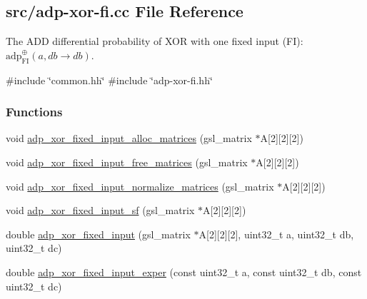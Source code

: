 \hypertarget{adp-xor-fi_8cc}{\subsection{src/adp-\/xor-\/fi.cc \-File \-Reference}
\label{adp-xor-fi_8cc}
}


\-The \-A\-D\-D differential probability of \-X\-O\-R with one fixed input (\-F\-I)\-: $\mathrm{adp}^{\oplus}_{\mathrm{FI}}(a,db \rightarrow db)$.  


{\ttfamily \#include \char`\"{}common.\-hh\char`\"{}}\*
{\ttfamily \#include \char`\"{}adp-\/xor-\/fi.\-hh\char`\"{}}\*
\subsubsection*{\-Functions}
\begin{DoxyCompactItemize}
\item 
void \hyperlink{adp-xor-fi_8cc_a605b1bc0ca9dd17b1dfc2b818bb1fcc4}{adp\-\_\-xor\-\_\-fixed\-\_\-input\-\_\-alloc\-\_\-matrices} (gsl\-\_\-matrix $\ast$\-A\mbox{[}2\mbox{]}\mbox{[}2\mbox{]}\mbox{[}2\mbox{]})
\item 
void \hyperlink{adp-xor-fi_8cc_acb74304054bfcdeb6ab52fd2aeadc9fe}{adp\-\_\-xor\-\_\-fixed\-\_\-input\-\_\-free\-\_\-matrices} (gsl\-\_\-matrix $\ast$\-A\mbox{[}2\mbox{]}\mbox{[}2\mbox{]}\mbox{[}2\mbox{]})
\item 
void \hyperlink{adp-xor-fi_8cc_a2c0e217c519708b43b9b18866874f252}{adp\-\_\-xor\-\_\-fixed\-\_\-input\-\_\-normalize\-\_\-matrices} (gsl\-\_\-matrix $\ast$\-A\mbox{[}2\mbox{]}\mbox{[}2\mbox{]}\mbox{[}2\mbox{]})
\item 
void \hyperlink{adp-xor-fi_8cc_a37c75fcba5d5904b75461ab35ff8d80d}{adp\-\_\-xor\-\_\-fixed\-\_\-input\-\_\-sf} (gsl\-\_\-matrix $\ast$\-A\mbox{[}2\mbox{]}\mbox{[}2\mbox{]}\mbox{[}2\mbox{]})
\item 
double \hyperlink{adp-xor-fi_8cc_a99d9ef4f2707e61bbd739aa41c93dcb4}{adp\-\_\-xor\-\_\-fixed\-\_\-input} (gsl\-\_\-matrix $\ast$\-A\mbox{[}2\mbox{]}\mbox{[}2\mbox{]}\mbox{[}2\mbox{]}, uint32\-\_\-t a, uint32\-\_\-t db, uint32\-\_\-t dc)
\item 
double \hyperlink{adp-xor-fi_8cc_a3e8bb4c4a614a447a18d727c1adf219a}{adp\-\_\-xor\-\_\-fixed\-\_\-input\-\_\-exper} (const uint32\-\_\-t a, const uint32\-\_\-t db, const uint32\-\_\-t dc)
\end{DoxyCompactItemize}


